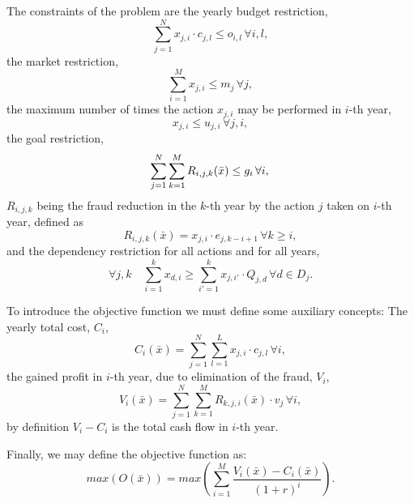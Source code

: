 The constraints of the problem are the yearly budget restriction,
\begin{equation}
    \sum_{j=1}^{N} x_{j, i} \cdot c_{j,l} \le o_{i,l} \, \forall i, l,
	\label{eq:budget}
\end{equation}
the market restriction,
\begin{equation}
     \sum_{i=1}^{M} x_{j, i} \le m_j \, \forall j,
	\label{eq:market}
\end{equation}
the maximum number of times the action $x_{j, i}$ may be performed in $i$-th year,
\begin{equation}
     x_{j, i} \le u_{j, i} \, \forall j, i,
	\label{eq:maxacts}
\end{equation}
the goal restriction,
\begin{equation}
    \label{eq:goal}
    \sum_{j=1}^{N} \sum_{k=1}^{M}R_{i,j,k}(\bar{x}) \leq g_i \, \forall i, \\
\end{equation}
$R_{i,j,k}$ being the fraud reduction in the $k$-th year by the action $j$ taken on $i$-th year, defined as
\begin{equation}
    \label{eq:rec}
    R_{i,j,k}(\bar{x}) = x_{j, i} \cdot e_{j, k - i + 1} \, \forall k \geq i,
\end{equation}
and the dependency restriction for all actions and for all years,
\begin{equation}
    \label{eq:dependency}
    \forall j,k \quad \sum_{i=1}^{k} x_{d, i} \ge \sum_{i'=1}^{k} x_{j, i'} \cdot Q_{j, d} \, \forall d \in D_j.
\end{equation}

To introduce the objective function we must define some auxiliary concepts:
The yearly total cost, $C_i$,
\begin{equation}
\label{eq:cost}
C_{i}(\bar{x}) =  \sum_{j=1}^{N} \sum_{l=1}^{L} x_{j, i} \cdot c_{j,l} \, \forall i,
\end{equation}
the gained profit in $i$-th year, due to elimination of the fraud, $V_i$,
\begin{equation}
    V_{i}(\bar{x}) = \sum_{j=1}^{N} \sum_{k=1}^{M} R_{k, j, i}(\bar{x}) \cdot v_j \, \forall i,
\end{equation}
by definition $V_i - C_i$ is the total cash flow in $i$-th year. 

Finally, we may define the objective function as:
\begin{equation}
    \label{eq:objective}
    max(O(\bar{x})) = max\left(\sum_{i=1}^{M} \frac{V_i(\bar{x}) - C_i(\bar{x})}{(1+r)^i}\right).
\end{equation}

